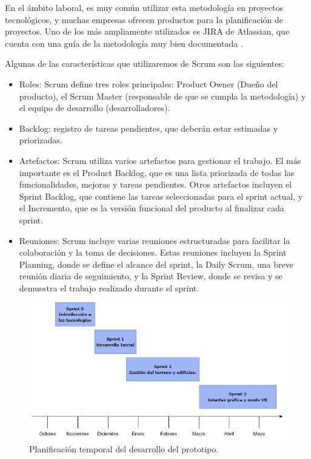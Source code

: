 \documentclass[a4paper, 11pt]{book}
\begin{document}
En el ámbito laboral, es muy común utilizar esta metodología en proyectos tecnológicos, y muchas empresas ofrecen productos para la planificación de proyectos. Uno de los más ampliamente utilizados es JIRA de Atlassian, que cuenta con una guía de la metodología muy bien documentada \cite{scrumGuide}.

Algunas de las características que utilizaremos de Scrum son las siguientes:
\begin{itemize}
\item Roles: Scrum define tres roles principales: Product Owner (Dueño del producto), el Scrum Master (responsable de que se cumpla la metodología) y el equipo de desarrollo (desarrolladores).
\item Backlog: registro de tareas pendientes, que deberán estar estimadas y priorizadas.
\item Artefactos: Scrum utiliza varios artefactos para gestionar el trabajo. El más importante es el Product Backlog, que es una lista priorizada de todas las funcionalidades, mejoras y tareas pendientes. Otros artefactos incluyen el Sprint Backlog, que contiene las tareas seleccionadas para el sprint actual, y el Incremento, que es la versión funcional del producto al finalizar cada sprint.
\item Reuniones: Scrum incluye varias reuniones estructuradas para facilitar la colaboración y la toma de decisiones. Estas reuniones incluyen la Sprint Planning, donde se define el alcance del sprint, la Daily Scrum, una breve reunión diaria de seguimiento, y la Sprint Review, donde se revisa y se demuestra el trabajo realizado durante el sprint.
\end{itemize}

\begin{figure}[H]
  \centering
  \includegraphics[width=12cm, keepaspectratio]{img/scrum.jpg}
  \caption{Planificación temporal del desarrollo del prototipo.}
  \label{fig:scrum}
\end{figure}
\end{document}
